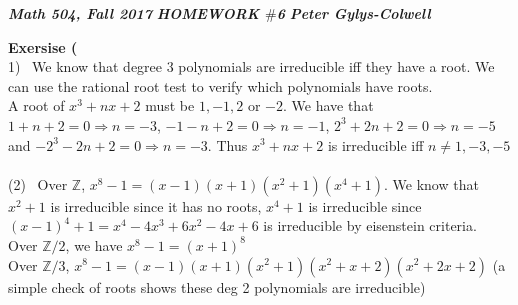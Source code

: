 \documentclass[12pt]{article}
\newenvironment{ques}[1]{\textbf{Exersise #1}\vspace{1 mm}\\ }{\bigskip}
\theoremstyle{definition}
\newcommand{\Z}{\mathbb Z}
\begin{document}
\noindent \textit{\textbf{Math 504, Fall 2017}} \hspace{1.3cm}
\textit{\textbf{HOMEWORK $\#$6}} \hspace{1.3cm} \textit{\textbf{Peter
Gylys-Colwell}} 

\vspace{1cm}

\begin{ques}{6.1}
	(1) \ We know that degree $3$ polynomials are irreducible iff they have a
	root. We can use the rational root test to verify which polynomials have roots.\\
	A root of $x^3 + nx + 2$ must be $1, -1, 2$ or $-2$. We have that $1 + n + 2 =
	0 \Rightarrow n = -3$, $-1 - n + 2 = 0 \Rightarrow n = -1$, $2^3 + 2n + 2
	=0 \Rightarrow n = -5$ and $-2^3 - 2n + 2 = 0 \Rightarrow n = -3$. Thus
	$x^3 + nx + 2$ is irreducible iff $n\neq 1, -3, -5$\\
	\\
	(2) \ Over $\Z$, $x^8 - 1 = (x-1)(x + 1)(x^2 + 1)(x^4 + 1)$. We know that
	$x^2 + 1$ is irreducible since it has no roots, $x^4 + 1$ is irreducible
	since $(x-1)^4 + 1 = x^4 - 4x^3 + 6x^2 - 4x + 6$ is irreducible by
	eisenstein criteria. \\
	Over $\Z/2$, we have $x^8 - 1 = (x + 1)^8$\\
	Over $\Z/3$, $x^8 - 1 = (x-1)(x + 1)(x^2 + 1)(x^2 + x + 2)(x^2 + 2x + 2)$
	(a simple check of roots shows these deg 2 polynomials are irreducible)
\end{ques}
\end{document}
